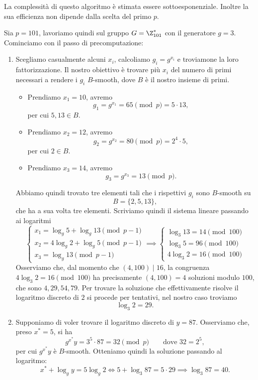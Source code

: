 	\begin{oss}
	La complessità di questo algoritmo è stimata essere sottoesponenziale. Inoltre la sua efficienza non dipende dalla scelta del primo \(p\).
	\end{oss}

	\begin{ese}
	Sia \(p=101\), lavoriamo quindi sul gruppo \(G=\Z_{101}^*\) con il generatore \(g=3\). Cominciamo con il passo di precomputazione:
	\begin{enumerate}
		\item Scegliamo casualmente alcuni \(x_i\), calcoliamo \(g_i=g^{x_i}\) e troviamone la loro fattorizzazione. Il nostro obiettivo è trovare più \(x_i\) del numero di primi necessari a rendere i \(g_i\) \(B\)-smooth, dove \(B\) è il nostro insieme di primi.
		\begin{itemize}
			\item Prendiamo \(x_1=10\), avremo
				\[
				g_1 = g^{x_1} = 65 \pmod{p} = 5 \cdot 13,
				\]
			per cui \(5,13 \in B\).
			\item Prendiamo \(x_2=12\), avremo
				\[
				g_2 = g^{x_2} = 80 \pmod{p} = 2^4 \cdot 5,
				\]
			per cui \(2\in B\).
			\item Prendiamo \(x_3 = 14\), avremo
				\[
				g_3 = g^{x_3} = 13 \pmod{p}.
				\]
		\end{itemize}
		Abbiamo quindi trovato tre elementi tali che i rispettivi \(g_i\) sono \(B\)-smooth su
			\[
			B = \{2,5,13\},
			\]
		che ha a sua volta tre elementi. Scriviamo quindi il sistema lineare passando ai logaritmi
			\[
			\begin{cases}
			x_1 = \log_g 5 + \log_g 13 \pmod{p-1}\\
			x_2 = 4\log_g 2 + \log_g 5 \pmod{p-1}\\
			x_3 = \log_g 13 \pmod{p-1}
			\end{cases} \implies
			\begin{cases}
			\log_3 13 = 14 \pmod{100}\\
			\log_3 5 = 96 \pmod{100}\\
			4\log_3 2 = 16 \pmod{100}
			\end{cases}
			\]
		Osserviamo che, dal momento che \((4,100)\mid 16\), la congruenza \(4\log_3 2 =16 \pmod{100}\) ha precisamente \((4,100)=4\) soluzioni modulo \(100\), che sono \(4,29,54,79\). Per trovare la soluzione che effettivamente risolve il logaritmo discreto di \(2\) si procede per tentativi, nel nostro caso troviamo
			\[
			\log_3 2 = 29.
			\]
		\item Supponiamo di voler trovare il logaritmo discreto di \(y=87\). Osserviamo che, preso \(x^*=5\), si ha
			\[
			g^{x^*}y = 3^5 \cdot 87 = 32 \pmod{p} \qquad\text{dove }32 =2^5,
			\]
		per cui \(g^{x^*}y\) è \(B\)-smooth. Otteniamo quindi la soluzione passando al logaritmo:
			\[
			x^* + \log_g y = 5\log_g 2 \iff 5 + \log_3 87 = 5 \cdot 29 \implies \log_3 87 = 40.
			\]
	\end{enumerate}
	\end{ese}